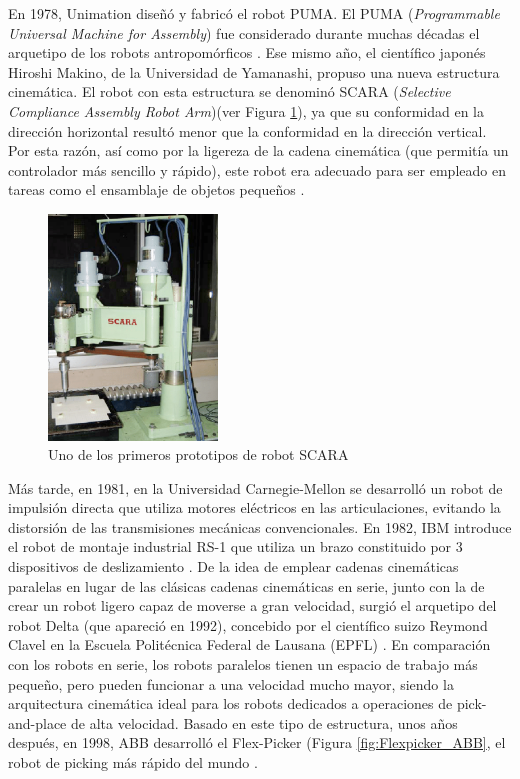 En 1978, Unimation diseñó y fabricó el robot PUMA. El PUMA (\textit{Programmable Universal Machine for Assembly}) fue considerado durante muchas décadas el arquetipo de los robots antropomórficos \cite{Gasparetto19}. Ese mismo año, el científico japonés Hiroshi Makino, de la Universidad de Yamanashi, propuso una nueva estructura cinemática. El robot con esta estructura se denominó SCARA (\textit{Selective Compliance Assembly Robot Arm})(ver Figura \ref{fig:Scara}), ya que su conformidad en la dirección horizontal resultó menor que la conformidad en la dirección vertical. Por esta razón, así como por la ligereza de la cadena cinemática (que permitía un controlador más sencillo y rápido), este robot era adecuado para ser empleado en tareas como el ensamblaje de objetos pequeños \cite{Makino80}.
  
  \begin{figure} [H]
    \begin{center}
      \includegraphics[width=45mm]{figs/Scara.png}
    \end{center}
    \caption{Uno de los primeros prototipos de robot SCARA}
    \label{fig:Scara}
  \end{figure}
  
Más tarde, en 1981, en la Universidad Carnegie-Mellon se desarrolló un robot de impulsión directa que utiliza motores eléctricos en las articulaciones, evitando la distorsión de las transmisiones mecánicas convencionales. En 1982, IBM introduce el robot de montaje industrial RS-1 que utiliza un brazo constituido por 3 dispositivos de deslizamiento \cite{Sanchez07b}. De la idea de emplear cadenas cinemáticas paralelas en lugar de las clásicas cadenas cinemáticas en serie, junto con la de crear un robot ligero capaz de moverse a gran velocidad, surgió el arquetipo del robot Delta (que apareció en 1992), concebido por el científico suizo Reymond Clavel en la Escuela Politécnica Federal de Lausana (EPFL) \cite{Clavel91}. En comparación con los robots en serie, los robots paralelos tienen un espacio de trabajo más pequeño, pero pueden funcionar a una velocidad mucho mayor, siendo la arquitectura cinemática ideal para los robots dedicados a operaciones de pick-and-place de alta velocidad. Basado en este tipo de estructura, unos años después, en 1998, ABB desarrolló el Flex-Picker (Figura \ref{fig:Flexpicker_ABB}, el robot de picking más rápido del mundo \cite{Gasparetto19}.\\
  
